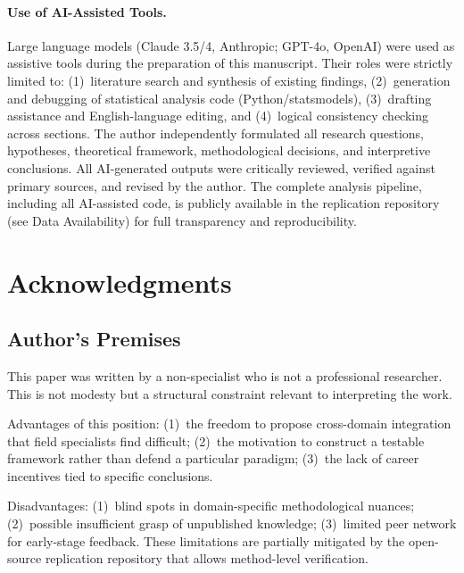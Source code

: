 \documentclass[a4paper,11pt,titlepage]{article}
\begin{document}
\paragraph{Use of AI-Assisted Tools.}
Large language models (Claude 3.5/4, Anthropic; GPT-4o, OpenAI) were used as assistive tools during the preparation of this manuscript. Their roles were strictly limited to: (1)~literature search and synthesis of existing findings, (2)~generation and debugging of statistical analysis code (Python/statsmodels), (3)~drafting assistance and English-language editing, and (4)~logical consistency checking across sections. The author independently formulated all research questions, hypotheses, theoretical framework, methodological decisions, and interpretive conclusions. All AI-generated outputs were critically reviewed, verified against primary sources, and revised by the author. The complete analysis pipeline, including all AI-assisted code, is publicly available in the replication repository (see Data Availability) for full transparency and reproducibility.

\section*{Acknowledgments}

\subsection*{Author's Premises}

This paper was written by a non-specialist who is not a professional researcher. This is not modesty but a structural constraint relevant to interpreting the work.

Advantages of this position: (1)~the freedom to propose cross-domain integration that field specialists find difficult; (2)~the motivation to construct a testable framework rather than defend a particular paradigm; (3)~the lack of career incentives tied to specific conclusions.

Disadvantages: (1)~blind spots in domain-specific methodological nuances; (2)~possible insufficient grasp of unpublished knowledge; (3)~limited peer network for early-stage feedback. These limitations are partially mitigated by the open-source replication repository that allows method-level verification.
\end{document}
